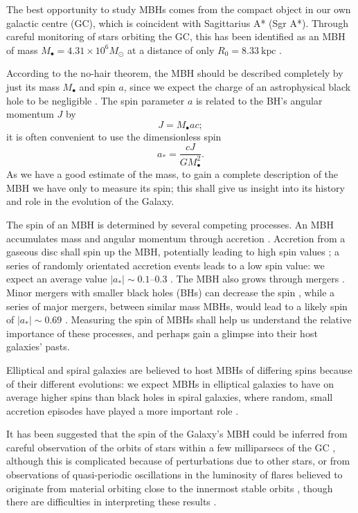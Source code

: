 \documentclass[useAMS,usedcolumn,usegraphicx,usenatbib]{mn2e}
\newcommand{\units}[1]{\ensuremath{~\mathrm{#1}}}
\begin{document}
The best opportunity to study MBHs comes from the compact object in our own galactic centre (GC), which is coincident with Sagittarius A* (Sgr A*). Through careful monitoring of stars orbiting the GC, this has been identified as an MBH of mass $M_\bullet = 4.31 \times 10^6 M_\odot$ at a distance of only $R_0 = 8.33\units{kpc}$ \citep{Gillessen2009}.

According to the no-hair theorem, the MBH should be described completely by just its mass $M_\bullet$ and spin $a$, since we expect the charge of an astrophysical black hole to be negligible \citep{Chandrasekhar1998}. The spin parameter $a$ is related to the BH's angular momentum $J$ by
\begin{equation}
J = M_\bullet ac;
\end{equation}
it is often convenient to use the dimensionless spin
\begin{equation}
a_\ast = \frac{cJ}{GM_\bullet^2}.
\end{equation}
As we have a good estimate of the mass, to gain a complete description of the MBH we have only to measure its spin; this shall give us insight into its history and role in the evolution of the Galaxy.

The spin of an MBH is determined by several competing processes. An MBH accumulates mass and angular momentum through accretion \citep{Volonteri2010}. Accretion from a gaseous disc shall spin up the MBH, potentially leading to high spin values \citep{Volonteri2005}; a series of randomly orientated accretion events leads to a low spin value: we expect an average value $|a_\ast| \sim 0.1$--$0.3$ \citep{King2006}. The MBH also grows through mergers \citep{Yu2002, Malbon2007}. Minor mergers with smaller black holes (BHs) can decrease the spin \citep*{Hughes2003}, while a series of major mergers, between similar mass MBHs, would lead to a likely spin of $|a_\ast| \sim 0.69$ \citep{Berti2007, Gonzalez2007}. Measuring the spin of MBHs shall help us understand the relative importance of these processes, and perhaps gain a glimpse into their host galaxies' pasts.

Elliptical and spiral galaxies are believed to host MBHs of differing spins because of their different evolutions: we expect MBHs in elliptical galaxies to have on average higher spins than black holes in spiral galaxies, where random, small accretion episodes have played a more important role \citep*{Volonteri2007, Sikora2007}.

It has been suggested that the spin of the Galaxy's MBH could be inferred from careful observation of the orbits of stars within a few milliparsecs of the GC \citep{Merritt2010}, although this is complicated because of perturbations due to other stars, or from observations of quasi-periodic oscillations in the luminosity of flares believed to originate from material orbiting close to the innermost stable orbits \citep{Genzel2003a, Hamaus2009}, though there are difficulties in interpreting these results \citep{Psaltis2008a}.
\end{document}
